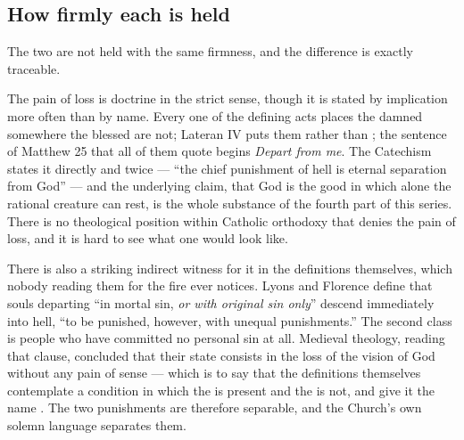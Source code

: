 \subsection{How firmly each is held}

The two are not held with the same firmness, and the difference is exactly traceable.

The pain of loss is doctrine in the strict sense, though it is stated by implication more often than by name. Every one of the defining acts places the damned somewhere the blessed are not; Lateran IV puts them  rather than ; the sentence of Matthew 25 that all of them quote begins \emph{Depart from me}. The Catechism states it directly and twice --- ``the chief punishment of hell is eternal separation from God'' --- and the underlying claim, that God is the good in which alone the rational creature can rest, is the whole substance of the fourth part of this series. There is no theological position within Catholic orthodoxy that denies the pain of loss, and it is hard to see what one would look like.

There is also a striking indirect witness for it in the definitions themselves, which nobody reading them for the fire ever notices. Lyons and Florence define that souls departing ``in mortal sin, \emph{or with original sin only}'' descend immediately into hell, ``to be punished, however, with unequal punishments.'' The second class is people who have committed no personal sin at all. Medieval theology, reading that clause, concluded that their state consists in the loss of the vision of God without any pain of sense --- which is to say that the definitions themselves contemplate a condition in which the  is present and the  is not, and give it the name . The two punishments are therefore separable, and the Church's own solemn language separates them.

